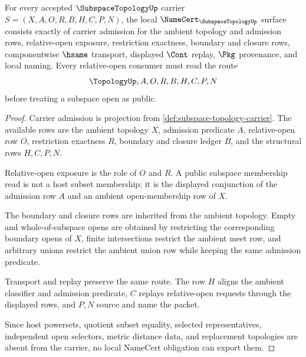 \begin{theorem}
\label{thm:subspace-topology-namecert-obligations}
For every accepted $\SubspaceTopologyUp$ carrier $S=(X,A,O,R,B,H,C,P,N)$, the local $\NameCert_{\SubspaceTopologyUp}$ surface consists exactly of carrier admission for the ambient topology and admission rows, relative-open exposure, restriction exactness, boundary and closure rows, componentwise $\hsame$ transport, displayed $\Cont$ replay, $\Pkg$ provenance, and local naming. Every relative-open consumer must read the route
$$
\TopologyUp,A,O,R,B,H,C,P,N
$$
before treating a subspace open as public.
\end{theorem}
\begin{proof}
Carrier admission is projection from \autoref{def:subspace-topology-carrier}. The available rows are the ambient topology $X$, admission predicate $A$, relative-open row $O$, restriction exactness $R$, boundary and closure ledger $B$, and the structural rows $H,C,P,N$.

Relative-open exposure is the role of $O$ and $R$. A public subspace membership read is not a host subset membership; it is the displayed conjunction of the admission row $A$ and an ambient open-membership row of $X$.

The boundary and closure rows are inherited from the ambient topology. Empty and whole-of-subspace opens are obtained by restricting the corresponding boundary opens of $X$, finite intersections restrict the ambient meet row, and arbitrary unions restrict the ambient union row while keeping the same admission predicate.

Transport and replay preserve the same route. The row $H$ aligns the ambient classifier and admission predicate, $C$ replays relative-open requests through the displayed rows, and $P,N$ source and name the packet.

Since host powersets, quotient subset equality, selected representatives, independent open selectors, metric distance data, and replacement topologies are absent from the carrier, no local NameCert obligation can export them.
\end{proof}

